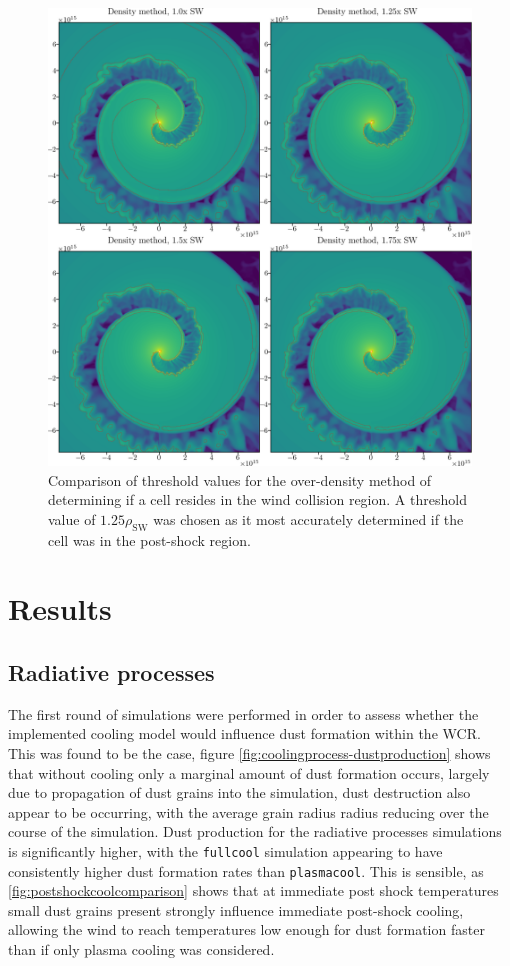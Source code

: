 \begin{figure}
  \centering
  \includegraphics[width=5in]{assets/overdensity-method.png}
  \caption[Comparison of threshold values for over-density method]{Comparison of threshold values for the over-density method of determining if a cell resides in the wind collision region.
  A threshold value of $1.25\rho_\text{SW}$ was chosen as it most accurately determined if the cell was in the post-shock region.}
  \label{fig:overdensity-threshold}
\end{figure}

\section{Results}

\subsection{Radiative processes}

The first round of simulations were performed in order to assess whether the implemented cooling model would influence dust formation within the WCR.
This was found to be the case, figure \ref{fig:coolingprocess-dustproduction} shows that without cooling only a marginal amount of dust formation occurs, largely due to propagation of dust grains into the simulation, dust destruction also appear to be occurring, with the average grain radius radius reducing over the course of the simulation. 
Dust production for the radiative processes simulations is significantly higher, with the \texttt{fullcool} simulation appearing to have consistently higher dust formation rates than \texttt{plasmacool}.
This is sensible, as \ref{fig:postshockcoolcomparison} shows that at immediate post shock temperatures small dust grains present strongly influence immediate post-shock cooling, allowing the wind to reach temperatures low enough for dust formation faster than if only plasma cooling was considered.

